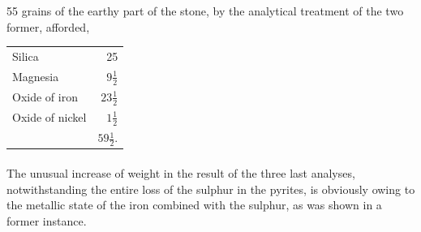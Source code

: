 \documentclass[a4paper, 12pt, oneside, twocolumn]{article}
\begin{document}
55 grains of the earthy part of the stone, by the analytical treatment of the two former, afforded,
\begin{table}[H]
    \centering\bfseries
    \begin{tabular}{l r}
        Silica & 25 \\
        Magnesia & $9\frac{1}{2}$ \\
        Oxide of iron & $23\frac{1}{2}$ \\ 
        Oxide of nickel & $1\frac{1}{2}$ \\ \hline
        ~ & $59\frac{1}{2}$. \\
    \end{tabular}
\end{table}
\paragraph{}
The unusual increase of weight in the result of the three last analyses, notwithstanding the entire loss of the sulphur in the pyrites, is obviously owing to the metallic state of the iron combined with the sulphur, as was shown in a former instance.
\end{document}

